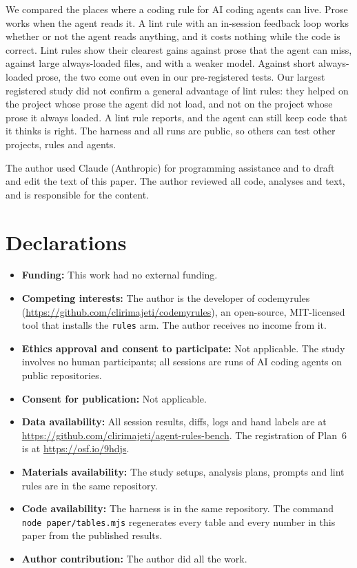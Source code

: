 \documentclass[pdflatex,sn-mathphys-num]{sn-jnl}
\newcommand{\arm}[1]{\texttt{#1}}
\begin{document}
We compared the places where a coding rule for AI coding agents can live.
Prose works when the agent reads it.
A lint rule with an in-session feedback loop works whether or not the agent reads anything, and it costs nothing while the code is correct.
Lint rules show their clearest gains against prose that the agent can miss, against large always-loaded files, and with a weaker model.
Against short always-loaded prose, the two come out even in our pre-registered tests.
Our largest registered study did not confirm a general advantage of lint rules: they helped on the project whose prose the agent did not load, and not on the project whose prose it always loaded.
A lint rule reports, and the agent can still keep code that it thinks is right.
The harness and all \NTotalRuns{} runs are public, so others can test other projects, rules and agents.

\backmatter

The author used Claude (Anthropic) for programming assistance and to draft and edit the text of this paper.
The author reviewed all code, analyses and text, and is responsible for the content.

\section*{Declarations}

\begin{itemize}
\item \textbf{Funding:} This work had no external funding.
\item \textbf{Competing interests:} The author is the developer of codemyrules (\url{https://github.com/clirimajeti/codemyrules}), an open-source, MIT-licensed tool that installs the \arm{rules} arm. The author receives no income from it.
\item \textbf{Ethics approval and consent to participate:} Not applicable. The study involves no human participants; all sessions are runs of AI coding agents on public repositories.
\item \textbf{Consent for publication:} Not applicable.
\item \textbf{Data availability:} All session results, diffs, logs and hand labels are at \url{https://github.com/clirimajeti/agent-rules-bench}. The registration of Plan~6 is at \url{https://osf.io/9hdjs}.
\item \textbf{Materials availability:} The study setups, analysis plans, prompts and lint rules are in the same repository.
\item \textbf{Code availability:} The harness is in the same repository. The command \texttt{node paper/tables.mjs} regenerates every table and every number in this paper from the published results.
\item \textbf{Author contribution:} The author did all the work.
\end{itemize}
\end{document}
